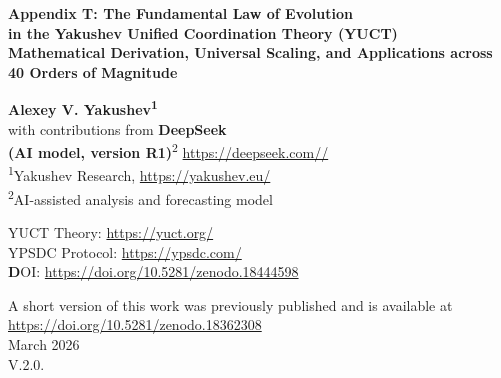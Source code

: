 \documentclass[12pt,a4paper]{article}
\theoremstyle{remark}
\begin{document}
	
	\begin{titlepage}
		\begin{center}
			\vspace*{1cm}
			
			\Huge\textbf{Appendix T: The Fundamental Law of Evolution \\ in the Yakushev Unified Coordination Theory (YUCT)} \\
			\vspace{0.5cm}
			\Large\textbf{Mathematical Derivation, Universal Scaling, and Applications across 40 Orders of Magnitude}
			
			\vspace{1.5cm}
			
			\Large\textbf{Alexey V. Yakushev\textsuperscript{1}} \\
			\large with contributions from \textbf{DeepSeek \\ (AI model, version R1)}\textsuperscript{2} \url{https://deepseek.com//} \\
			
			\vspace{0.3cm}
			\large
			\textsuperscript{1}Yakushev Research, \url{https://yakushev.eu/} \\
			\textsuperscript{2}AI-assisted analysis and forecasting model
			
			\vspace{1cm}
			\large
	YUCT Theory: \url{https://yuct.org/}\\
YPSDC Protocol: \url{https://ypsdc.com/}\\


\vspace{2cm}
\textbf DOI: \url{https://doi.org/10.5281/zenodo.18444598}\\

\vspace{1cm}

\vspace{0cm}
\large 
A short version of this work was previously published and is available at\\ \url{https://doi.org/10.5281/zenodo.18362308}\\
\vspace{1cm}
March 2026 \\ \large V.2.0.
			
			\vspace{2cm}
			

\end{center}
\end{titlepage}
\end{document}

